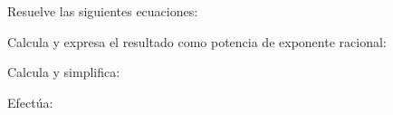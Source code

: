 \documentclass[addpoints,spanish, 12pt,a4paper]{exam}
\begin{document}
\begin{questions}
\begin{multicols}{1}
\begin{parts}
        \end{parts}
        \end{multicols}
        \question Resuelve las siguientes ecuaciones:
        \begin{multicols}{1} 
        \end{multicols}
        \question Calcula y expresa el resultado como potencia de exponente racional:
        \begin{multicols}{1} 
        \end{multicols}
        \question Calcula y simplifica:
        \begin{multicols}{1} 
        \end{multicols}
        \question Efectúa:
        \begin{multicols}{1} 
\end{multicols}
\end{questions}
\end{document}
